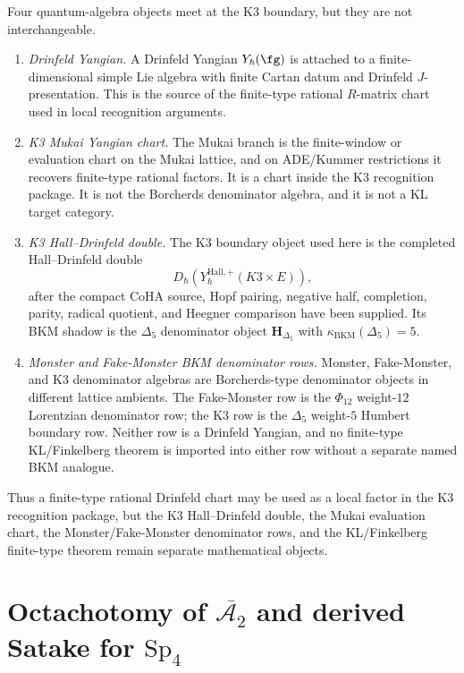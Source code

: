 \begin{remark}
\label{rem:dl-k3-monster-yangian-firewall}
Four quantum-algebra objects meet at the K3 boundary, but they are not
interchangeable.
\begin{enumerate}[label=\textup{(\roman*)}]
\item \emph{Drinfeld Yangian.} A Drinfeld Yangian $Y_\hbar(\fg)$ is
attached to a finite-dimensional simple Lie algebra with finite Cartan
datum and Drinfeld $J$-presentation. This is the source of the
finite-type rational $R$-matrix chart used in local recognition
arguments.
\item \emph{K3 Mukai Yangian chart.} The Mukai branch is the
finite-window or evaluation chart on the Mukai lattice, and on
ADE/Kummer restrictions it recovers finite-type rational factors. It
is a chart inside the K3 recognition package. It is not the
Borcherds denominator algebra, and it is not a KL target category.
\item \emph{K3 Hall--Drinfeld double.} The K3 boundary object used
here is the completed Hall--Drinfeld double
\[
 D_\hbar\!\left(Y^{\mathrm{Hall},+}_\hbar(K3\times E)\right),
\]
after the compact CoHA source, Hopf pairing, negative half,
completion, parity, radical quotient, and Heegner comparison have been
supplied. Its BKM shadow is the $\Delta_5$ denominator object
$\mathbf H_{\Delta_5}$ with $\kappa_{\mathrm{BKM}}(\Delta_5)=5$.
\item \emph{Monster and Fake-Monster BKM denominator rows.} Monster,
Fake-Monster, and K3 denominator algebras are Borcherds-type
denominator objects in different lattice ambients. The Fake-Monster
row is the $\Phi_{12}$ weight-$12$ Lorentzian denominator row; the K3
row is the $\Delta_5$ weight-$5$ Humbert boundary row. Neither row is
a Drinfeld Yangian, and no finite-type KL/Finkelberg theorem is
imported into either row without a separate named BKM analogue.
\end{enumerate}
Thus a finite-type rational Drinfeld chart may be used as a local
factor in the K3 recognition package, but the K3 Hall--Drinfeld
double, the Mukai evaluation chart, the Monster/Fake-Monster
denominator rows, and the KL/Finkelberg finite-type theorem remain
separate mathematical objects.
\end{remark}

\section{Octachotomy of $\overline{\mathcal{A}_2}$ and derived Satake for $\mathrm{Sp}_4$}
\label{sec:dl-octachotomy-satake-sp4}

